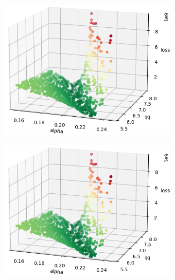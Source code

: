 \begin{figure}
	\centering
	\begin{subfigure}[b]{0.4\textwidth}
		\centering
		\includegraphics[width=\textwidth]{./figures/sensitivity/sensitivity_zoom1_0_2.png}	
	\end{subfigure}
	\begin{subfigure}[b]{0.4\textwidth}
		\centering
		\includegraphics[width=\textwidth]{./figures/sensitivity/sensitivity_zoom1_0_2.png}	
	\end{subfigure}
	\begin{subfigure}[b]{0.4\textwidth}
		\centering

\end{subfigure}
\end{figure}
